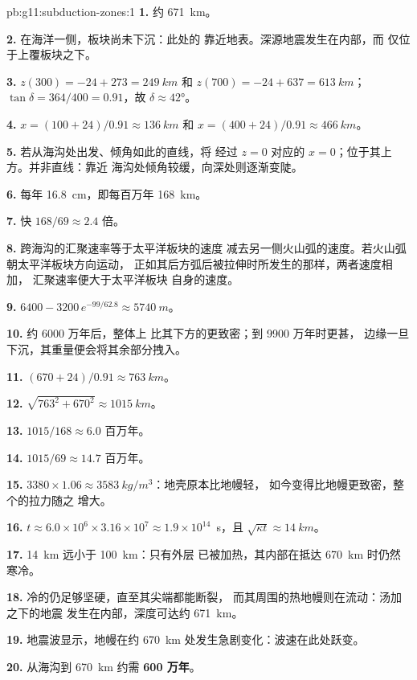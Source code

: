 \begin{solution}{pb:g11:subduction-zones:1}
\textbf{1.} 约 \qty{671}{km}。

\textbf{2.} 在海洋一侧，板块尚未下沉：此处的
靠近地表。深源地震发生在内部，而
仅位于上覆板块之下。

\textbf{3.} $z(300) = -24 + 273 = \qty{249}{km}$ 和
$z(700) = -24 + 637 = \qty{613}{km}$；$\tan\delta = 364/400 = 0.91$，故
$\delta \approx \ang{42}$。

\textbf{4.} $x = (100 + 24)/0.91 \approx \qty{136}{km}$ 和
$x = (400 + 24)/0.91 \approx \qty{466}{km}$。

\textbf{5.} 若从海沟处出发、倾角如此的直线，将
经过 $z = 0$ 对应的 $x = 0$；位于其上方。并非直线：靠近
海沟处倾角较缓，向深处则逐渐变陡。

\textbf{6.} 每年 \qty{16.8}{cm}，即每百万年 \qty{168}{km}。

\textbf{7.} 快 $168/69 \approx 2.4$ 倍。

\textbf{8.} 跨海沟的汇聚速率等于太平洋板块的速度
减去另一侧火山弧的速度。若火山弧朝太平洋板块方向运动，
正如其后方弧后被拉伸时所发生的那样，两者速度相加，
汇聚速率便大于太平洋板块
自身的速度。

\textbf{9.} $6400 - 3200\,e^{-99/62.8} \approx \qty{5740}{m}$。

\textbf{10.} 约 6000 万年后，整体上
比其下方的更致密；到 9900 万年时更甚，
边缘一旦下沉，其重量便会将其余部分拽入。

\textbf{11.} $(670 + 24)/0.91 \approx \qty{763}{km}$。

\textbf{12.} $\sqrt{763^2 + 670^2} \approx \qty{1015}{km}$。

\textbf{13.} $1015/168 \approx 6.0$ 百万年。

\textbf{14.} $1015/69 \approx 14.7$ 百万年。

\textbf{15.} $3380 \times 1.06 \approx \qty{3583}{kg/m^3}$：地壳原本比地幔轻，
如今变得比地幔更致密，整个的拉力随之
增大。

\textbf{16.} $t \approx 6.0 \times 10^6 \times 3.16 \times 10^7 \approx
1.9 \times 10^{14}$~s，且 $\sqrt{\kappa t} \approx \qty{14}{km}$。

\textbf{17.} \qty{14}{km} 远小于 \qty{100}{km}：只有外层
已被加热，其内部在抵达
\qty{670}{km} 时仍然寒冷。

\textbf{18.} 冷的仍足够坚硬，直至其尖端都能断裂，
而其周围的热地幔则在流动：汤加之下的地震
发生在内部，深度可达约 \qty{671}{km}。

\textbf{19.} 地震波显示，地幔在约
\qty{670}{km} 处发生急剧变化：波速在此处跃变。

\textbf{20.} 从海沟到
\qty{670}{km} 约需 \textbf{600 万年}。
\end{solution}
